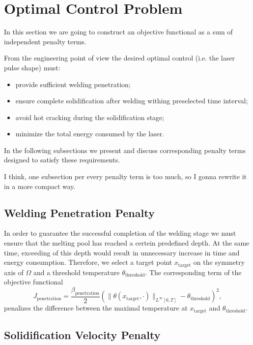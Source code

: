 \section{Optimal Control Problem}
\label{sec:objective}

{\color{TolHighContrastBlue}
In this section we are going to construct an objective functional as a sum of independent penalty terms.
}

From the engineering point of view the desired optimal control (i.e. the laser pulse shape) must:
\begin{itemize}
	\item provide sufficient welding penetration;
	\item ensure complete solidification after welding withing preselected time interval;
	\item avoid hot cracking during the solidification stage;
	\item minimize the total energy consumed by the laser.
\end{itemize}

In the following subsections we present and discuss corresponding penalty terms designed to satisfy these requirements.

{\color{TolHighContrastBlue}
I think, one subsection per every penalty term is too much, so I gonna rewrite it in a more compact way.
}

\subsection{Welding Penetration Penalty}



In order to guarantee the successful completion of the welding stage we must ensure that the melting pool has reached a certein predefined depth. At the same time, exceeding of this depth would result in unnecessary increase in time and energy consumption. Therefore, we select a target point $x_{\text{target}}$ on the symmetry axis of $\Omega$ and a threshold temperature $\theta_{\text{threshold}}$. The corresponding term of the objective functional
\begin{equation}
	J_{\text{penetration}} = \frac{\beta_\text{penetration}}{2} \left( \| \theta(x_{\text{target}},\cdot) \|_{L^{\infty}[0,T]} - \theta_{\text{threshold}} \right)^2,
\end{equation}
penalizes the difference between the maximal temperature at $x_{\text{target}}$ and $\theta_{\text{threshold}}$.


\subsection{Solidification Velocity Penalty}
\label{subsec:velocity}

